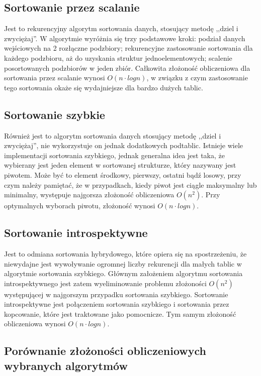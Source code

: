 \subsection{Sortowanie przez scalanie}
Jest to rekurencyjny algorytm sortowania danych, stosujący metodę ,,dziel i zwyciężaj''. W algorytmie wyróżnia się trzy podstawowe kroki: podział danych wejściowych na 2 rozłączne podzbiory; rekurencyjne zastosowanie sortowania dla każdego podzbioru, aż do uzyskania struktur jednoelementowych; scalenie posortowanych podzbiorów w jeden zbiór. Całkowita złożoność obliczeniowa dla sortowania przez scalanie wynosi $O(n \cdot log n)$, w związku z czym zastosowanie tego sortowania okaże się wydajniejsze dla bardzo dużych tablic.


\subsection{Sortowanie szybkie}
Również jest to algorytm sortowania danych stosujący metodę ,,dziel i zwyciężaj'', nie wykorzystuje on jednak dodatkowych podtablic. Istnieje wiele implementacji sortowania szybkiego, jednak generalna idea jest taka, że wybierany jest jeden element w sortowanej strukturze, który nazywany jest piwotem. Może być to element środkowy, pierwszy, ostatni bądź losowy, przy czym należy pamiętać, że w przypadkach, kiedy piwot jest ciągle maksymalny lub minimalny, występuje najgorsza złożoność obliczeniowa $O(n^2)$. Przy optymalnych wyborach piwotu, złożoność wynosi $O(n \cdot log n)$. 


\subsection{Sortowanie introspektywne}
Jest to odmiana sortowania hybrydowego, które opiera się na spostrzeżeniu, że niewydajne jest wywoływanie ogromnej liczby rekurencji dla małych tablic w algorytmie sortowania szybkiego. Głównym założeniem algorytmu sortowania introspektywnego jest zatem wyeliminowanie problemu złożoności $O(n^2)$ występującej w najgorszym przypadku sortowania szybkiego. Sortowanie introspektywne jest połączeniem sortowania szybkiego i sortowania przez kopcowanie, które jest traktowane jako pomocnicze. Tym samym złożoność obliczeniowa wynosi $O(n \cdot log n)$.


\subsection{Porównanie złożoności obliczeniowych wybranych algorytmów}


